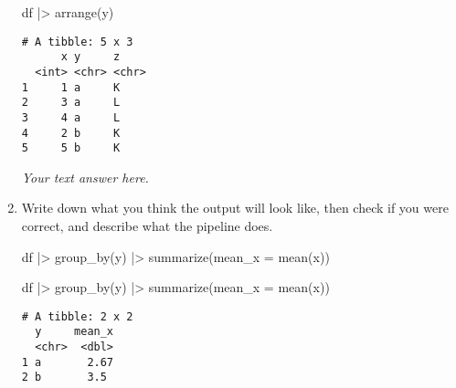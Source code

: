 \documentclass[
  letterpaper,
  DIV=11,
  numbers=noendperiod]{scrreprt}
\newenvironment{Shaded}{\begin{snugshade}}{\end{snugshade}}
\newcommand{\AttributeTok}[1]{\textcolor[rgb]{0.40,0.45,0.13}{#1}}
\newcommand{\FunctionTok}[1]{\textcolor[rgb]{0.28,0.35,0.67}{#1}}
\newcommand{\NormalTok}[1]{\textcolor[rgb]{0.00,0.23,0.31}{#1}}
\newcommand{\SpecialCharTok}[1]{\textcolor[rgb]{0.37,0.37,0.37}{#1}}
\begin{document}
\begin{enumerate}
\begin{tcolorbox}
\begin{Shaded}
\begin{Highlighting}[]
\NormalTok{df }\SpecialCharTok{|\textgreater{}}
  \FunctionTok{arrange}\NormalTok{(y)}
\end{Highlighting}
\end{Shaded}

\begin{verbatim}
# A tibble: 5 x 3
      x y     z    
  <int> <chr> <chr>
1     1 a     K    
2     3 a     L    
3     4 a     L    
4     2 b     K    
5     5 b     K    
\end{verbatim}

  \emph{Your text answer here.}

  \end{tcolorbox}
\item
  Write down what you think the output will look like, then check if you
  were correct, and describe what the pipeline does.

\begin{Shaded}
\begin{Highlighting}[]
\NormalTok{df }\SpecialCharTok{|\textgreater{}}
  \FunctionTok{group\_by}\NormalTok{(y) }\SpecialCharTok{|\textgreater{}}
  \FunctionTok{summarize}\NormalTok{(}\AttributeTok{mean\_x =} \FunctionTok{mean}\NormalTok{(x))}
\end{Highlighting}
\end{Shaded}

  \begin{tcolorbox}[enhanced jigsaw, left=2mm, rightrule=.15mm, bottomtitle=1mm, opacitybacktitle=0.6, leftrule=.75mm, opacityback=0, colframe=quarto-callout-note-color-frame, bottomrule=.15mm, coltitle=black, toptitle=1mm, colback=white, titlerule=0mm, colbacktitle=quarto-callout-note-color!10!white, title={Answer}, toprule=.15mm, breakable, arc=.35mm]

\begin{Shaded}
\begin{Highlighting}[]
\NormalTok{df }\SpecialCharTok{|\textgreater{}}
  \FunctionTok{group\_by}\NormalTok{(y) }\SpecialCharTok{|\textgreater{}}
  \FunctionTok{summarize}\NormalTok{(}\AttributeTok{mean\_x =} \FunctionTok{mean}\NormalTok{(x))}
\end{Highlighting}
\end{Shaded}

\begin{verbatim}
# A tibble: 2 x 2
  y     mean_x
  <chr>  <dbl>
1 a       2.67
2 b       3.5 
\end{verbatim}


\end{tcolorbox}
\end{enumerate}
\end{document}
